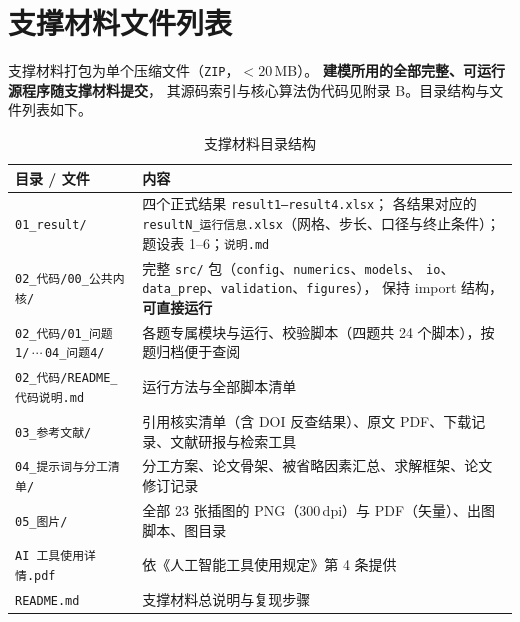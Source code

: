\appendix


\setcounter{table}{0}
\renewcommand{\thetable}{\thesection.\arabic{table}}

\section{支撑材料文件列表}
\setcounter{table}{0}

\noindent 支撑材料打包为单个压缩文件（\texttt{ZIP}，$<20$\,MB）。
\textbf{建模所用的全部完整、可运行源程序随支撑材料提交}，
其源码索引与核心算法伪代码见附录 B。目录结构与文件列表如下。

\begin{table}[H]
  \centering
  \caption{支撑材料目录结构}
  \label{tab:supportfiles}
  \footnotesize
  \begin{tabularx}{\textwidth}{@{}lX@{}}
    \toprule
    目录 / 文件 & 内容 \\
    \midrule
    \texttt{01\_result/} &
      四个正式结果 \texttt{result1--result4.xlsx}；
      各结果对应的 \texttt{resultN\_运行信息.xlsx}（网格、步长、口径与终止条件）；
      题设表 1--6；\texttt{说明.md} \\
    \texttt{02\_代码/00\_公共内核/} &
      完整 \texttt{src/} 包（\texttt{config}、\texttt{numerics}、\texttt{models}、
      \texttt{io}、\texttt{data\_prep}、\texttt{validation}、\texttt{figures}），
      保持 import 结构，\textbf{可直接运行} \\
    \texttt{02\_代码/01\_问题1/}\,$\cdots$\,\texttt{04\_问题4/} &
      各题专属模块与运行、校验脚本（四题共 24 个脚本），按题归档便于查阅 \\
    \texttt{02\_代码/README\_代码说明.md} &
      运行方法与全部脚本清单 \\
    \texttt{03\_参考文献/} &
      引用核实清单（含 DOI 反查结果）、原文 PDF、下载记录、文献研报与检索工具 \\
    \texttt{04\_提示词与分工清单/} &
      分工方案、论文骨架、被省略因素汇总、求解框架、论文修订记录 \\
    \texttt{05\_图片/} &
      全部 23 张插图的 PNG（300\,dpi）与 PDF（矢量）、出图脚本、图目录 \\
    \texttt{AI 工具使用详情.pdf} &
      依《人工智能工具使用规定》第 4 条提供 \\
    \texttt{README.md} & 支撑材料总说明与复现步骤 \\
    \bottomrule
  \end{tabularx}
\end{table}

